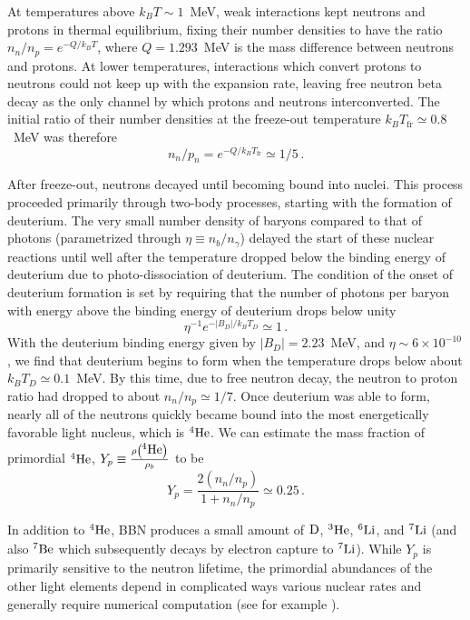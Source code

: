 At temperatures above $k_BT\sim 1$~MeV, weak interactions kept neutrons and protons in thermal equilibrium, fixing their number densities to have the ratio $n_n/n_p = e^{-Q/k_BT}$, where $Q = 1.293$~MeV is the mass difference between neutrons and protons.  At lower temperatures, interactions which convert protons to neutrons could not keep up with the expansion rate, leaving free neutron beta decay as the only channel by which protons and neutrons interconverted.  The initial ratio of their number densities at the freeze-out temperature $k_BT_\mathrm{fr}\simeq0.8$~MeV was therefore
\begin{equation}
	n_n/p_n = e^{-Q/k_BT_\mathrm{fr}} \simeq 1/5 \, .
\end{equation}


After freeze-out, neutrons decayed until becoming bound into nuclei.  This process proceeded primarily through two-body processes, starting with the formation of deuterium.  The very small number density of baryons compared to that of photons (parametrized through $\eta\equiv n_b/n_\gamma$) delayed the start of these nuclear reactions until well after the temperature dropped below the binding energy of deuterium due to photo-dissociation of deuterium.  The condition of the onset of deuterium formation is set by requiring that the number of photons per baryon with energy above the binding energy of deuterium drops below unity
\begin{equation}
	\eta^{-1}e^{-|B_D|/k_BT_D} \simeq 1 \, .
\end{equation}
With the deuterium binding energy given by $|B_D|=2.23$~MeV, and $\eta\sim6\times10^{-10}$, we find that deuterium begins to form when the temperature drops below about $k_BT_D\simeq 0.1$~MeV.  By this time, due to free neutron decay, the neutron to proton ratio had dropped to about $n_n/n_p\simeq 1/7$.  Once deuterium was able to form, nearly all of the neutrons quickly became bound into the most energetically favorable light nucleus, which is $\nucl{4}{ }{He}$.  We can estimate the mass fraction of primordial $\nucl{4}{ }{He}$, $Y_p\equiv \frac{\rho\left(\nucl{4}{ }{He}\right)}{\rho_b}$ to be
\begin{equation}
	Y_p = \frac{2(n_n/n_p)}{1+n_n/n_p} \simeq 0.25 \, .
\end{equation}

In addition to $\nucl{4}{ }{He}$, BBN produces a small amount of $\nucl{ }{ }{D}$, $\nucl{3}{ }{He}$, $\nucl{6}{ }{Li}$, and $\nucl{7}{ }{Li}$ (and also $\nucl{7}{ }{Be}$ which subsequently decays by electron capture to $\nucl{7}{ }{Li}$).  While $Y_p$ is primarily sensitive to the neutron lifetime, the primordial abundances of the other light elements depend in complicated ways various nuclear rates and generally require numerical computation (see for example \cite{Wagoner:1966pv,Cyburt:2001pp,Pisanti:2007hk}).

